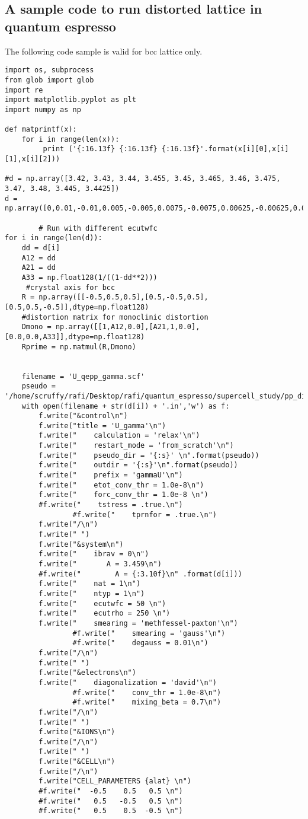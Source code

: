 \subsection{A sample code to run distorted lattice in quantum espresso}
The following code sample is valid for bcc lattice only.
\lstset{style=pythn}
\begin{lstlisting}
import os, subprocess
from glob import glob
import re
import matplotlib.pyplot as plt 
import numpy as np

def matprintf(x):
    for i in range(len(x)):
         print ('{:16.13f} {:16.13f} {:16.13f}'.format(x[i][0],x[i][1],x[i][2]))

#d = np.array([3.42, 3.43, 3.44, 3.455, 3.45, 3.465, 3.46, 3.475, 3.47, 3.48, 3.445, 3.4425])
d = np.array([0,0.01,-0.01,0.005,-0.005,0.0075,-0.0075,0.00625,-0.00625,0.0025,-0.0025,0.00375,-0.00375,0.00125,-0.00125,0.02,-0.02])
    
        # Run with different ecutwfc
for i in range(len(d)):
    dd = d[i]
    A12 = dd
    A21 = dd
    A33 = np.float128(1/((1-dd**2)))
     #crystal axis for bcc
    R = np.array([[-0.5,0.5,0.5],[0.5,-0.5,0.5],[0.5,0.5,-0.5]],dtype=np.float128)
    #distortion matrix for monoclinic distortion
    Dmono = np.array([[1,A12,0.0],[A21,1,0.0],[0.0,0.0,A33]],dtype=np.float128)
    Rprime = np.matmul(R,Dmono)


    filename = 'U_qepp_gamma.scf' 
    pseudo = '/home/scruffy/rafi/Desktop/rafi/quantum_espresso/supercell_study/pp_dir'
    with open(filename + str(d[i]) + '.in','w') as f:
        f.write("&control\n")
        f.write("title = 'U_gamma'\n")
        f.write("    calculation = 'relax'\n")
        f.write("    restart_mode = 'from_scratch'\n")
        f.write("    pseudo_dir = '{:s}' \n".format(pseudo))
        f.write("    outdir = '{:s}'\n".format(pseudo))
        f.write("    prefix = 'gammaU'\n")
        f.write("    etot_conv_thr = 1.0e-8\n")
        f.write("    forc_conv_thr = 1.0e-8 \n")
        #f.write("    tstress = .true.\n")
                #f.write("    tprnfor = .true.\n")
        f.write("/\n")
        f.write(" ")
        f.write("&system\n")
        f.write("    ibrav = 0\n")
        f.write("       A = 3.459\n")
        #f.write("        A = {:3.10f}\n" .format(d[i]))
        f.write("    nat = 1\n")
        f.write("    ntyp = 1\n")
        f.write("    ecutwfc = 50 \n")
        f.write("    ecutrho = 250 \n")
        f.write("    smearing = 'methfessel-paxton'\n")
                #f.write("    smearing = 'gauss'\n")
                #f.write("    degauss = 0.01\n")
        f.write("/\n")
        f.write(" ")
        f.write("&electrons\n")
        f.write("    diagonalization = 'david'\n")
                #f.write("    conv_thr = 1.0e-8\n")
                #f.write("    mixing_beta = 0.7\n")
        f.write("/\n")
        f.write(" ")
        f.write("&IONS\n")
        f.write("/\n")
        f.write(" ")
        f.write("&CELL\n")
        f.write("/\n")
        f.write("CELL_PARAMETERS {alat} \n")
        #f.write("  -0.5    0.5   0.5 \n")
        #f.write("   0.5   -0.5   0.5 \n")
        #f.write("   0.5    0.5  -0.5 \n")
    

\end{lstlisting}
